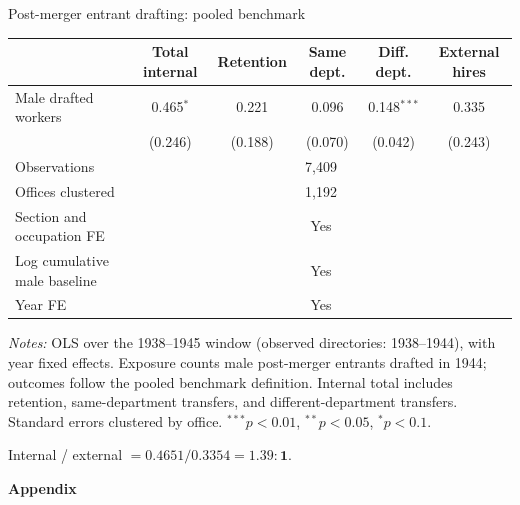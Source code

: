 \begin{frame}[t]{Post-merger entrant drafting: pooled benchmark}
\tiny\centering
\begin{threeparttable}
\begin{tabular}{lccccc}
\toprule
 & Total internal & Retention & Same dept. & Diff. dept. & External hires \\
\midrule
Male drafted workers & 0.465$^{*}$ & 0.221 & 0.096 & 0.148$^{***}$ & 0.335 \\
 & (0.246) & (0.188) & (0.070) & (0.042) & (0.243) \\
\midrule
Observations & \multicolumn{5}{c}{7,409} \\
Offices clustered & \multicolumn{5}{c}{1,192} \\
Section and occupation FE & \multicolumn{5}{c}{Yes} \\
Log cumulative male baseline & \multicolumn{5}{c}{Yes} \\
Year FE & \multicolumn{5}{c}{Yes} \\
\bottomrule
\end{tabular}
\begin{tablenotes}[flushleft]
\tiny\item \textit{Notes:} OLS over the 1938--1945 window (observed directories: 1938--1944), with year fixed effects. Exposure counts male post-merger entrants drafted in 1944; outcomes follow the pooled benchmark definition. Internal total includes retention, same-department transfers, and different-department transfers. Standard errors clustered by office. $^{***}p<0.01$, $^{**}p<0.05$, $^{*}p<0.1$.
\end{tablenotes}
\end{threeparttable}
\vspace{2mm}
\par Internal / external $= 0.4651 / 0.3354 = \mathbf{1.39:1}$.
\end{frame}

\begin{frame}[plain]\centering\vfill{\Large\bfseries Appendix}\vfill\end{frame}


